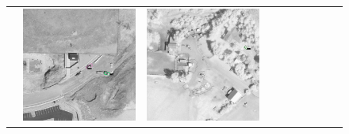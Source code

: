 \begin{figure}[h!]
\begin{tabularx}{\textwidth}{c|*{9}{X}}
    & \includegraphics[trim={440pt 360pt 460pt 555pt},clip,width=\linewidth]{images/015Results/03ablation/comp_images/ir/427.png}
    & \includegraphics[trim={740pt 420pt 180pt 510pt},clip,width=\linewidth]{images/015Results/03ablation/comp_images/ir/523.png}

\end{tabularx}
\end{figure}
